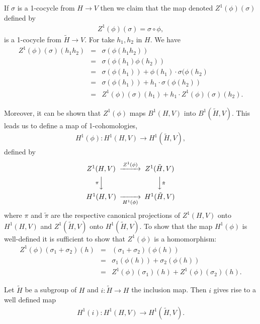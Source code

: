 If $\sigma$ is a 1-cocycle from $H\rightarrow V$ then we claim that the map denoted $Z^1(\phi)(\sigma)$ defined by
\begin{eqnarray*}
	Z^1(\phi)(\sigma) = \sigma \circ \phi,
\end{eqnarray*}
is a 1-cocycle from $\tilde{H}\rightarrow V$. For take $h_1, h_2$ in $H$. We have
\begin{eqnarray*}
	Z^1(\phi)(\sigma)(h_1h_2) &=& \sigma(\phi(h_1h_2)) \\
		&=& \sigma(\phi(h_1)\phi(h_2)) \\
		&=& \sigma(\phi(h_1)) + \phi(h_1)\cdot\sigma(\phi(h_2) \\
		&=& \sigma(\phi(h_1)) + h_1\cdot\sigma(\phi(h_2)) \\
		&=& Z^1(\phi)(\sigma)(h_1) + h_1\cdot Z^1(\phi)(\sigma)(h_2).
\end{eqnarray*}

Moreover, it can be shown that $Z^1(\phi)$ maps $B^1(H, V)$ into $B^1(\tilde{H}, V)$. This leads us to define a map of 1-cohomologies,
\begin{eqnarray*}
	H^1(\phi):H^1(H, V) \rightarrow H^1(\tilde{H}, V),
\end{eqnarray*}
defined by
\begin{displaymath}
\begin{CD}
	Z^1(H, V) @>Z^1(\phi)>> Z^1(\tilde{H}, V)\\
	@V{\pi}VV                                  @VV{\tilde{\pi}}V\\
	H^1(H, V) @>>H^1(\phi)> H^1(\tilde{H}, V)
\end{CD}
\end{displaymath}
where $\pi$ and $\tilde\pi$ are the respective canonical projections of $Z^1(H, V)$ onto $H^1(H, V)$ and $Z^1(\tilde{H}, V)$ onto $H^1(\tilde{H}, V)$. To show that the map $H^1(\phi)$ is well-defined it is sufficient to show that $Z^1(\phi)$ is a homomorphism:
\begin{eqnarray*}
	Z^1(\phi)(\sigma_1 + \sigma_2)(h) &=& (\sigma_1 + \sigma_2)(\phi(h)) \\
		&=& \sigma_1(\phi(h)) + \sigma_2(\phi(h)) \\
		&=& Z^1(\phi)(\sigma_1)(h) + Z^1(\phi)(\sigma_2)(h).
\end{eqnarray*}

\begin{lemma}
Let $\tilde{H}$ be a subgroup of $H$ and $i:\tilde{H}\rightarrow H$ the inclusion map. Then $i$ gives rise to a well defined map
\begin{eqnarray*}
H^1(i):H^1(H, V)\rightarrow H^1(\tilde{H}, V).
\end{eqnarray*}
\end{lemma}


